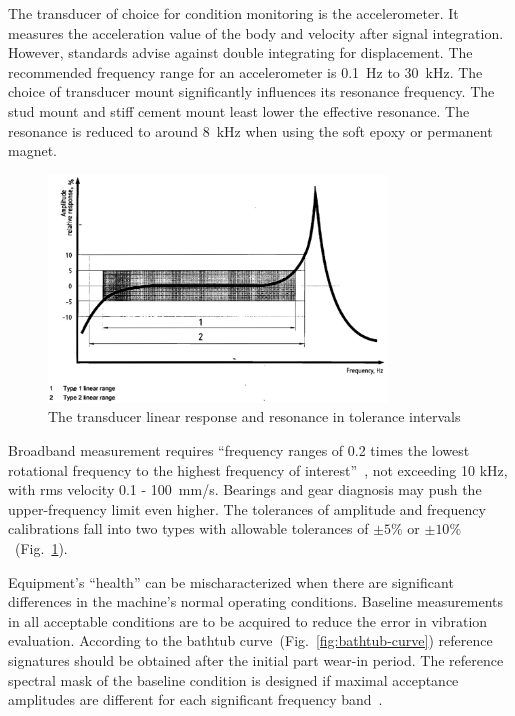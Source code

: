 The transducer of choice for condition monitoring is the accelerometer. It measures the acceleration value of the body and velocity after signal integration. However, standards advise against double integrating for displacement. The recommended frequency range for an accelerometer is 0.1~Hz to 30~kHz. The choice of transducer mount significantly influences its resonance frequency. The stud mount and stiff cement mount least lower the effective resonance. The resonance is reduced to around 8~kHz when using the soft epoxy or permanent magnet.

\begin{figure}[h]
	\centering
	\includegraphics[width=0.8\textwidth]{assets/analysis/transducer-response.png}
	\caption{The transducer linear response and resonance in tolerance intervals~\cite{noauthor_iso_2002}}
	\label{fig:tranducer-response}
\end{figure}

Broadband measurement requires ``frequency ranges of 0.2 times the lowest rotational frequency to the highest frequency of interest''~\cite{noauthor_iso_2002}, not exceeding 10 kHz, with rms velocity 0.1 - 100~mm/s. Bearings and gear diagnosis may push the upper-frequency limit even higher. The tolerances of amplitude and frequency calibrations fall into two types with allowable tolerances of $\pm 5 \%$ or $\pm 10 \%$~(Fig.~\ref{fig:tranducer-response}).

Equipment's ``health'' can be mischaracterized when there are significant differences in the machine's normal operating conditions. Baseline measurements in all acceptable conditions are to be acquired to reduce the error in vibration evaluation. According to the bathtub curve~(Fig.~\ref{fig:bathtub-curve}) reference signatures should be obtained after the initial part wear-in period. The reference spectral mask of the baseline condition is designed if maximal acceptance amplitudes are different for each significant frequency band~\cite{ziaran_technicka_2013}.

